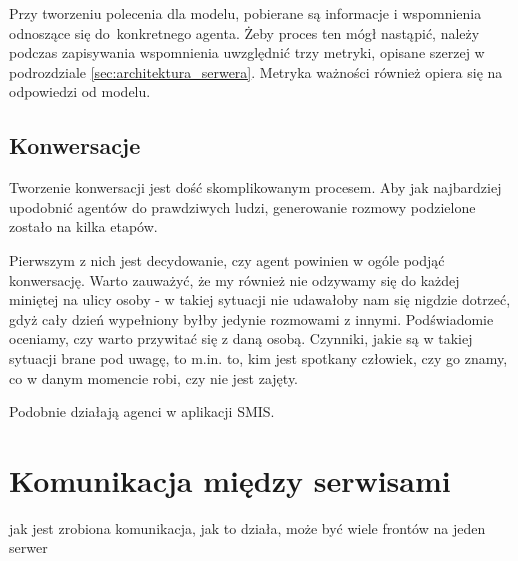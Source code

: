 Przy tworzeniu polecenia dla modelu, pobierane są informacje i wspomnienia odnoszące się do~konkretnego agenta. Żeby proces ten mógł nastąpić, należy podczas zapisywania wspomnienia uwzględnić trzy metryki, opisane szerzej w podrozdziale \ref{sec:architektura_serwera}. Metryka ważności również opiera się na odpowiedzi od modelu.

\subsection{Konwersacje}

Tworzenie konwersacji jest dość skomplikowanym procesem. Aby jak najbardziej upodobnić agentów do prawdziwych ludzi, generowanie rozmowy podzielone zostało na kilka etapów.

Pierwszym z nich jest decydowanie, czy agent powinien w ogóle podjąć konwersację. Warto zauważyć, że my również nie odzywamy się do każdej miniętej na ulicy osoby - w takiej sytuacji nie udawałoby nam się nigdzie dotrzeć, gdyż cały dzień wypełniony byłby jedynie rozmowami z innymi. Podświadomie oceniamy, czy warto przywitać się z daną osobą. Czynniki, jakie są w takiej sytuacji brane pod uwagę, to m.in. to, kim jest spotkany człowiek, czy go znamy, co w danym momencie robi, czy nie jest zajęty.

Podobnie działają agenci w aplikacji SMIS.




\section{Komunikacja między serwisami}

jak jest zrobiona komunikacja, jak to działa, może być wiele frontów na jeden serwer
